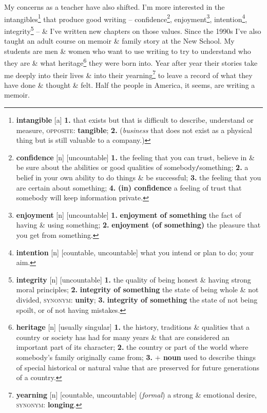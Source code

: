\documentclass[oneside]{book}
\numberwithin{equation}{section}
\begin{document}
My concerns as a teacher have also shifted. I'm more interested in the intangibles\footnote{\textbf{intangible} [a] \textbf{1.} that exists but that is difficult to describe, understand or measure, \textsc{opposite}: \textbf{tangible}; \textbf{2.} (\textit{business} that does not exist as a physical thing but is still valuable to a company.)} that produce good writing -- confidence\footnote{\textbf{confidence} [n] [uncountable] \textbf{1.} the feeling that you can trust, believe in \& be sure about the abilities or good qualities of somebody\texttt{/}something; \textbf{2.} a belief in your own ability to do things \& be successful; \textbf{3.} the feeling that you are certain about something; \textbf{4.} \textbf{(in) confidence} a feeling of trust that somebody will keep information private.}, enjoyment\footnote{\textbf{enjoyment} [n] [uncountable] \textbf{1.} \textbf{enjoyment of something} the fact of having \& using something; \textbf{2.} \textbf{enjoyment (of something)} the pleasure that you get from something.}, intention\footnote{\textbf{intention} [n] [countable, uncountable] what you intend or plan to do; your aim.}, integrity\footnote{\textbf{integrity} [n] [uncountable] \textbf{1.} the quality of being honest \& having strong moral principles; \textbf{2.} \textbf{integrity of something} the state of being whole \& not divided, \textsc{synonym}: \textbf{unity}; \textbf{3.} \textbf{integrity of something} the state of not being spoilt, or of not having mistakes.} -- \& I've written new chapters on those values. Since the 1990s I've also taught an adult course on memoir \& family story at the New School. My students are men \& women who want to use writing to try to understand who they are \& what heritage\footnote{\textbf{heritage} [n] [usually singular] \textbf{1.} the history, traditions \& qualities that a country or society has had for many years \& that are considered an important part of its character; \textbf{2.} the country or part of the world where somebody's family originally came from; \textbf{3.} \textbf{$+$ noun} used to describe things of special historical or natural value that are preserved for future generations of a country.} they were born into. Year after year their stories take me deeply into their lives \& into their yearning\footnote{\textbf{yearning} [n] [countable, uncountable] (\textit{formal}) a strong \& emotional desire, \textsc{synonym}: \textbf{longing}.} to leave a record of what they have done \& thought \& felt. Half the people in America, it seems, are writing a memoir.
\end{document}

